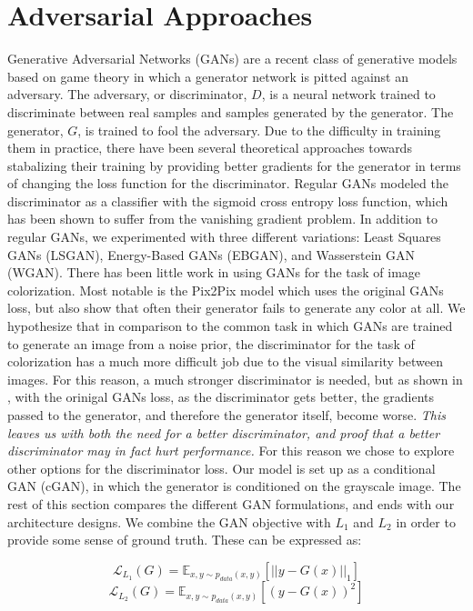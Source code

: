 \documentclass[10pt]{article}
\begin{document}
\section{Adversarial Approaches}
Generative Adversarial Networks (GANs) \cite{goodfellow2014generative} are a recent class of generative models based on game theory
in which a generator network is pitted against an adversary. The adversary, or discriminator, $D$, is a 
neural network trained to discriminate between real samples and samples generated by the generator. The
generator, $G$, is trained to fool the adversary. Due to the difficulty in
training them in practice, there have been several theoretical approaches towards stabalizing their training
by providing better gradients for the generator in terms of changing the loss function for the discriminator.
Regular GANs modeled the discriminator as a classifier with the sigmoid cross entropy loss function,
which has been shown to suffer from the vanishing gradient problem. In addition to regular GANs,
we experimented with three different variations: Least Squares GANs (LSGAN), Energy-Based GANs (EBGAN), and Wasserstein GAN
(WGAN). There has been little work in using GANs for the task of image colorization. Most notable is the
Pix2Pix \cite{isola2016image} model which uses the original GANs loss, but also show that often their generator fails to generate
any color at all. We hypothesize that in comparison to the common task in which GANs are trained to generate
an image from a noise prior, the discriminator for the task of colorization has a much more difficult job
due to the visual similarity between images. For this reason, a much stronger discriminator is needed, but
as shown in \cite{arjovsky2017towards}, with the orinigal GANs loss, as the discriminator gets better, the gradients passed to the
generator, and therefore the generator itself, become worse. \textit{This leaves us with both the need for a better discriminator,
and proof that a better discriminator may in fact hurt performance.} For this reason we chose to explore other
options for the discriminator loss. Our model is set up as a conditional GAN (cGAN), in which the
generator is conditioned on the grayscale image. The rest of this section compares the different GAN
formulations, and ends with our architecture designs. We combine the GAN objective with $L_1$ and $L_2$ in
order to provide some sense of ground truth. These can be expressed as:

\[ \mathcal{L}_{L_1}(G) = \mathbb{E}_{x,y\sim p_{data}(x,y)}[||y-G(x)||_1] \]
\[ \mathcal{L}_{L_2}(G) = \mathbb{E}_{x,y\sim p_{data}(x,y)}[(y-G(x))^2] \]
\end{document}
